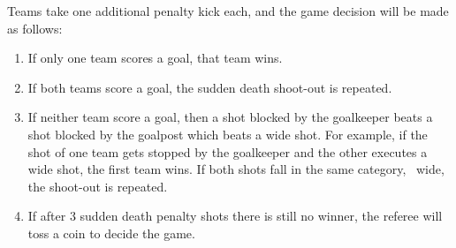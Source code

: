 Teams take one additional penalty kick each, and the game decision will be made as follows:

\begin{enumerate}
  \item If only one team scores a goal, that team wins.
  \item If both teams score a goal, the sudden death shoot-out is repeated.
  \item If neither team score a goal, then a shot blocked by the goalkeeper beats a shot blocked by the goalpost which beats a wide shot. For example, if the shot of one team gets stopped by the goalkeeper and the other executes a wide shot, the first team wins. If both shots fall in the same category, \eg~wide, the shoot-out is repeated.
  \item If after 3 sudden death penalty shots there is still no winner, the referee will toss a coin to decide the game.
\end{enumerate}
